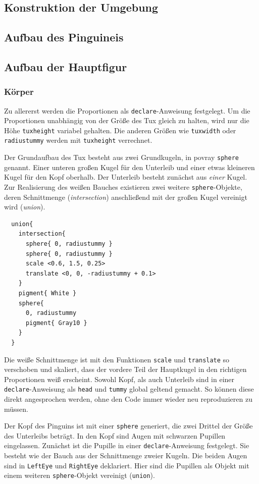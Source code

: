 \documentclass[11pt,parskip]{scrartcl}
\begin{document}
\subsection{Konstruktion der Umgebung}


\subsection{Aufbau des Pinguineis}


\subsection{Aufbau der Hauptfigur}


\subsubsection{Körper}
Zu allererst werden die Proportionen als \texttt{declare}-Anweisung festgelegt.
Um die Proportionen unabhängig von der Größe des Tux gleich zu halten, wird
nur die Höhe \texttt{tuxheight} variabel gehalten. Die anderen Größen wie
\texttt{tuxwidth} oder \texttt{radiustummy} werden mit \texttt{tuxheight}
verrechnet.

Der Grundaufbau des Tux besteht aus zwei Grundkugeln, in povray \texttt{sphere}
genannt. Einer unteren großen Kugel für den Unterleib und einer etwas kleineren
Kugel für den Kopf oberhalb. Der Unterleib besteht zunächst aus \emph{einer}
Kugel. Zur Realisierung des weißen Bauches existieren zwei weitere
\texttt{sphere}-Objekte, deren Schnittmenge (\emph{intersection}) anschließend
mit der großen Kugel vereinigt wird (\emph{union}).
%
\begin{lstlisting}
  union{
    intersection{
      sphere{ 0, radiustummy }
      sphere{ 0, radiustummy }
      scale <0.6, 1.5, 0.25>
      translate <0, 0, -radiustummy + 0.1>
    }
    pigment{ White }
    sphere{
      0, radiustummy
      pigment{ Gray10 }
    }
  }
\end{lstlisting}
%
Die weiße Schnittmenge ist mit den Funktionen \texttt{scale} und
\texttt{translate} so verschoben und skaliert, dass der vordere Teil der
Hauptkugel in den richtigen Proportionen weiß erscheint. Sowohl Kopf, als auch
Unterleib sind in einer \texttt{declare}-Anweisung als \texttt{head} und
\texttt{tummy} global geltend gemacht. So können diese direkt angesprochen
werden, ohne den Code immer wieder neu reproduzieren zu müssen.

Der Kopf des Pinguins ist mit einer \texttt{sphere} generiert, die zwei Drittel
der Größe des Unterleibs beträgt. In den Kopf sind Augen mit schwarzen Pupillen
eingelassen. Zunächst ist die Pupille in einer \texttt{declare}-Anweisung
festgelegt. Sie besteht wie der Bauch aus der Schnittmenge zweier Kugeln. Die
beiden Augen sind in \texttt{LeftEye} und \texttt{RightEye} deklariert. Hier
sind die Pupillen als Objekt mit einem weiteren \texttt{sphere}-Objekt
vereinigt (\texttt{union}).
\end{document}
